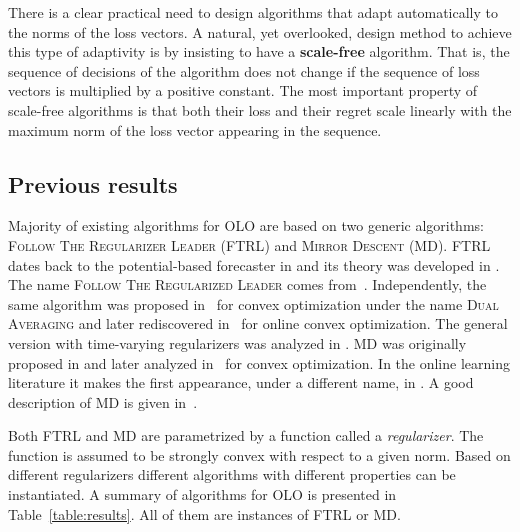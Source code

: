 
There is a clear practical need to design algorithms that adapt automatically
to the norms of the loss vectors.  A natural, yet overlooked, design method to
achieve this type of adaptivity is by insisting to have a \textbf{scale-free}
algorithm.  That is, the sequence of decisions of the algorithm does not change
if the sequence of loss vectors is multiplied by a positive constant.  The most
important property of scale-free algorithms is that both their loss and their
regret scale linearly with the maximum norm of the loss vector appearing in the
sequence.

\subsection{Previous results}

Majority of existing algorithms for OLO are based on two generic algorithms:
\textsc{Follow The Regularizer Leader} (\textsc{FTRL}) and \textsc{Mirror
Descent} (\textsc{MD}). \textsc{FTRL} dates back to the potential-based
forecaster in \cite[Chapter~11]{Cesa-Bianchi-Lugosi-2006} and its theory was
developed in \cite{Shalev-Shwartz-2007}.  The name \textsc{Follow The
Regularized Leader} comes from~\cite{Abernethy-Hazan-Rakhlin-2008}.
Independently, the same algorithm was proposed in~\cite{Nestorov-2009} for
convex optimization under the name \textsc{Dual Averaging} and later
rediscovered in~\cite{Xiao-2010} for online convex optimization. The general
version with time-varying regularizers was analyzed in
\cite{Orabona-Crammer-Cesa-Bianchi-2014}. \textsc{MD} was originally proposed
in \cite{Nemirovski-Yudin-1983} and later analyzed in~\cite{Beck-Teboulle-2003}
for convex optimization. In the online learning literature it makes the first
appearance, under a different name, in \cite{Kivinen-Warmuth-1997}. A good
description of \textsc{MD} is given in~\cite{Rakhlin-Sridharan-2009}.

Both \textsc{FTRL} and \textsc{MD} are parametrized by a function called a
\emph{regularizer}. The function is assumed to be strongly convex with respect
to a given norm. Based on different regularizers different algorithms with
different properties can be instantiated. A summary of algorithms for OLO is
presented in Table~\ref{table:results}.  All of them are instances of
\textsc{FTRL} or \textsc{MD}.

